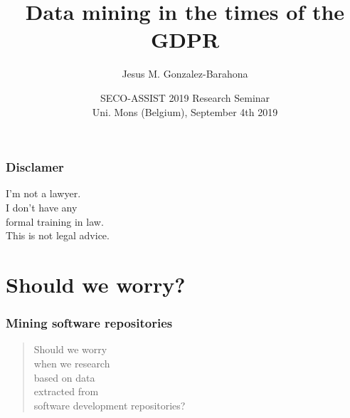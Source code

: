 \documentclass[17pt,aspectratio=169,hyperref={pdfusetitle,colorlinks,allcolors=olive}]{beamer}
\title[Data mining \& GDPR]{Data mining in the times of the GDPR}
\author[Jesus M. Gonzalez-Barahona]{Jesus M. Gonzalez-Barahona}
\institute[URJC]{Universidad Rey Juan Carlos \\
  @jgbarah ~~~~~ \url{http://github.com/jgbarah/presentations}}
\date{SECO-ASSIST 2019 Research Seminar \\ Uni. Mons (Belgium), September 4th 2019}
\begin{document}
\begin{frame}
  \maketitle
\end{frame}






\begin{frame}[fragile]
  \frametitle{Disclamer}

  \begin{center}
  {\Large
    I'm not a lawyer.\\
    \vspace{.8cm}
    I don't have any \\
    formal training in law.\\
    \vspace{.8cm}
    This is not legal advice.\\
  }
  \end{center}
  
\end{frame}

\section{Should we worry?}

\begin{frame}[fragile]
  \frametitle{Mining software repositories}

  \begin{quote}
    Should we worry \\
    when we research \\
    based on data \\
    extracted from \\
    software development repositories?
  \end{quote}

\end{frame}
\end{document}

